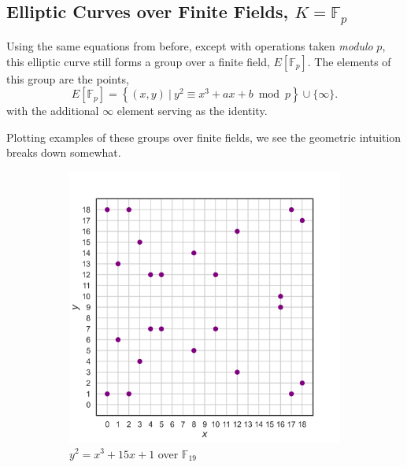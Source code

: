 \documentclass[11pt, a4paper]{report}
\newcommand{\field}{\mathbb{F}}
\begin{document}
\subsection{Elliptic Curves over Finite Fields, $K = \field_p$}

Using the same equations from before, except with operations taken \textit{modulo} $p$, this elliptic curve still forms a group over a finite field, $E[\field_p]$. The elements of this group are the points, 
\[ E[\field_p] = \left\lbrace (x,y)\ |\ y^2 \equiv x^3 + ax + b \bmod p \right\rbrace \cup \lbrace \infty \rbrace. \]
with the additional $\infty$ element serving as the identity.

Plotting examples of these groups over finite fields, we see the geometric intuition breaks down somewhat.
\begin{figure}[ht]
\centering
\begin{subfigure}{0.49\textwidth}
\centering
\includegraphics[width = \textwidth]{krationalpoints19.png}
\caption{$y^2 = x^3 + 15x + 1$ over $\field_{19}$}
\label{fig:left}
\end{subfigure}
\begin{subfigure}{0.49\textwidth}
\centering

\end{subfigure}
\end{figure}
\end{document}
